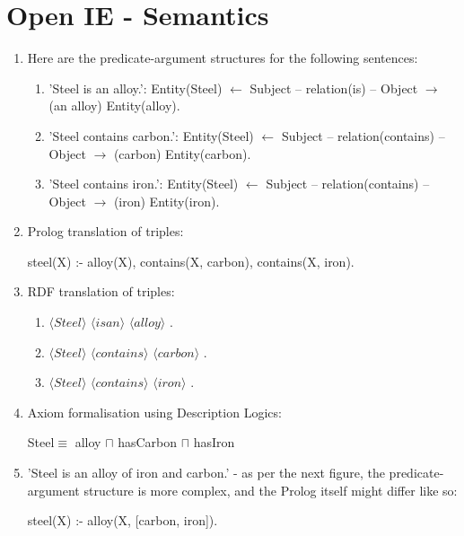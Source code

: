 \documentclass[12pt]{report}
\begin{document}
\section{Open IE - Semantics}
\begin{enumerate}
  \item Here are the predicate-argument structures for the following sentences:
  \begin{enumerate}
    \item 'Steel is an alloy.': Entity(Steel) $\leftarrow$ Subject --
    relation(is) -- Object $\rightarrow$ (an alloy) Entity(alloy).
    \item 'Steel contains carbon.': Entity(Steel) $\leftarrow$ Subject --
    relation(contains) -- Object $\rightarrow$ (carbon) Entity(carbon).
    \item 'Steel contains iron.': Entity(Steel) $\leftarrow$ Subject --
    relation(contains) -- Object $\rightarrow$ (iron) Entity(iron).
  \end{enumerate}
  \item Prolog translation of triples:\par
    steel(X) :- alloy(X), contains(X, carbon), contains(X, iron).
  \item RDF translation of triples:
  \begin{enumerate}
    \item $\langle Steel \rangle$ $\langle is an \rangle$
    $\langle alloy \rangle$ .
    \item $\langle Steel \rangle$ $\langle contains \rangle$
    $\langle carbon \rangle$ .
    \item $\langle Steel \rangle$ $\langle contains \rangle$
    $\langle iron \rangle$ .
  \end{enumerate}
  \item Axiom formalisation using Description Logics: \par
    Steel$\equiv$ alloy $\sqcap$ hasCarbon $\sqcap$ hasIron
  \item 'Steel is an alloy of iron and carbon.' - as per the next figure, the
  predicate-argument structure is more complex, and the Prolog itself might
  differ like so:\par
    steel(X) :- alloy(X, [carbon, iron]).\par


\end{enumerate}
\end{document}

